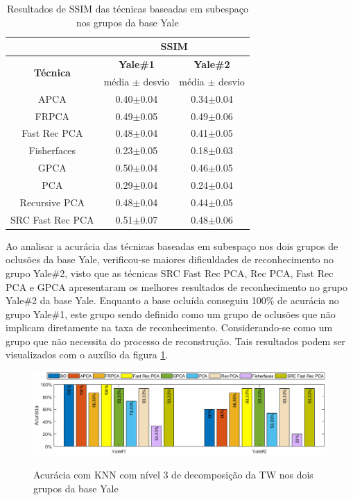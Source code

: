 \begin{table}[H]
\caption{Resultados de SSIM das técnicas baseadas em subespaço nos grupos da base Yale}
\centering
\begin{tabular}{|c|c|c|}
\cline{2-3}
 \multicolumn{1}{c|}{} & \multicolumn{2}{c|}{\textbf{SSIM}}\\ \hline
\multicolumn{1}{|c|}{\multirow{2}{*}{\textbf{Técnica} }}& \textbf{Yale\#1} &  \textbf{Yale\#2}   \\ \cline{2-3}

& média $\pm$ desvio & média $\pm$ desvio \\\hline 
APCA        	&0.40$\pm$0.04& 	0.34$\pm$0.04\\\hline
FRPCA       	&0.49$\pm$0.05&	    0.49$\pm$0.06\\\hline
Fast Rec PCA	&0.48$\pm$0.04&	    0.41$\pm$0.05\\\hline
Fisherfaces 	&0.23$\pm$0.05& 	0.18$\pm$0.03\\\hline
GPCA	        &0.50$\pm$0.04&	    0.46$\pm$0.05\\\hline
PCA	            &0.29$\pm$0.04& 	0.24$\pm$0.04\\\hline
Recursive PCA   &0.48$\pm$0.04&	    0.44$\pm$0.05\\\hline
SRC Fast Rec PCA     &0.51$\pm$0.07&	    0.48$\pm$0.06\\\hline

\end{tabular}
\label{tab:SSIM_subespaco_Yale}
\end{table}

Ao analisar a acurácia das técnicas baseadas em subespaço nos dois grupos de oclusões da base Yale, verificou-se maiores dificuldades de reconhecimento no grupo Yale\#2, visto que as técnicas SRC Fast Rec PCA, Rec PCA, Fast Rec PCA e GPCA apresentaram os melhores resultados de reconhecimento no grupo Yale\#2 da base Yale. Enquanto a base ocluída conseguiu 100\% de acurácia no grupo Yale\#1, este grupo sendo definido como um grupo de oclusões que não implicam diretamente na taxa de reconhecimento. Considerando-se como um grupo que não necessita do processo de reconstrução. Tais resultados podem ser visualizados com o auxílio da figura \ref{fig:acuracia_yale_subespaco_KNN}.

\begin{figure}[H]
\centering
\caption{Acurácia com KNN com nível 3 de decomposição da TW  nos dois grupos da base Yale}
\includegraphics[scale=0.55]{imgs4/acuracia/acuracia_Yale_subespaco_KNN}
\label{fig:acuracia_yale_subespaco_KNN}
\end{figure}

